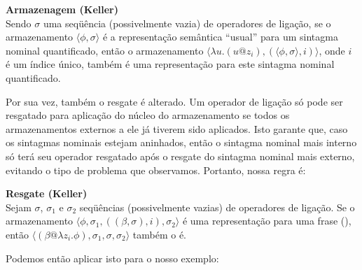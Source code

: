 \begin{oframed}\textbf{Armazenagem (Keller)}\\
Sendo $\sigma$ uma seqüência (possivelmente vazia) de operadores de ligação, se o armazenamento $\langle\phi, \sigma\rangle$ é a representação semântica ``usual'' para um sintagma nominal quantificado, então o armazenamento $\langle\lambda u.(u@z_i), (\langle \phi, \sigma \rangle, i) \rangle $, onde $i$ é um índice único, também é uma representação para este sintagma nominal quantificado.
\end{oframed}

Por sua vez, também o resgate é alterado. Um operador de ligação só pode ser resgatado para aplicação do núcleo do armazenamento se todos os armazenamentos externos a ele já tiverem sido aplicados. Isto garante que, caso os sintagmas nominais estejam aninhados, então o sintagma nominal mais interno só terá seu operador resgatado após o resgate do sintagma nominal mais externo, evitando o tipo de problema que observamos. Portanto, nossa regra é:

\begin{oframed}\textbf{Resgate (Keller)}\\
Sejam $\sigma$, $\sigma_1$ e $\sigma_2$ seqüências (possivelmente vazias) de operadores de ligação. Se o armazenamento $\langle \phi, \sigma_1, ((\beta, \sigma), i), \sigma_2 \rangle$ é uma representação para uma frase (), então $\langle (\beta @ \lambda z_i . \phi ), \sigma_1, \sigma, \sigma_2 \rangle$ também o é.
\end{oframed}

Podemos então aplicar isto para o nosso exemplo:

